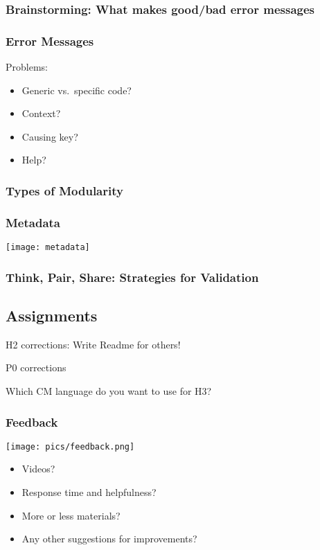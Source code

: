 \begin{frame}[fragile]
	\frametitle{Brainstorming: What makes good/bad error messages}
\end{frame}

\begin{frame}[fragile]
	\frametitle{Error Messages}

	Problems:
	\begin{itemize}[<+-| alert@+>]
	\item Generic vs.\ specific code?
	\item Context?
	\item Causing key?
	\item Help?
	\end{itemize}
\end{frame}

\breakframe

\begin{frame}
	\frametitle{Types of Modularity}
	\pause
	\Large
\end{frame}

\begin{frame}
	\frametitle{Metadata}

	\pause
	\texttt{[image: metadata]}
\end{frame}

\begin{assignment}
	\frametitle{Think, Pair, Share: Strategies for Validation}
\end{assignment}

\breakframe

\subsection{Assignments}

\begin{assignment}
	H2 corrections: Write Readme for others!
\end{assignment}

\begin{assignment}
	P0 corrections
\end{assignment}

\begin{assignment}
	Which CM language do you want to use for H3?
\end{assignment}

\begin{frame}
	\frametitle{Feedback}
	\hfill \texttt{[image: pics/feedback.png]}
	\vspace{-1cm}
	\begin{itemize}
		\item Videos?
		\item Response time and helpfulness?
		\item More or less materials?
		\item Any other suggestions for improvements?
	\end{itemize}
\end{frame}


